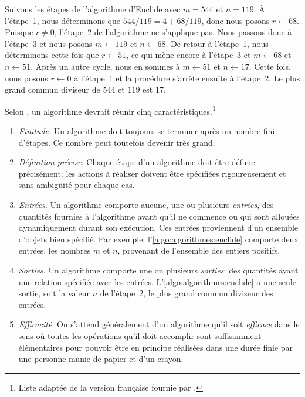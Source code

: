 Suivons les étapes de l'algorithme d'Euclide avec $m = 544$ et
$n = 119$. À l'étape~1, nous déterminons que $544/119 = 4 + 68/119$,
donc nous posons $r \leftarrow 68$. Puisque $r \neq 0$, l'étape~2 de
l'algorithme ne s'applique pas. Nous passons donc à l'étape~3 et nous
posons $m \leftarrow 119$ et $n \leftarrow 68$. De retour à l'étape~1,
nous déterminons cette fois que $r \leftarrow 51$, ce qui mène encore
à l'étape~3 et $m \leftarrow 68$ et $n \leftarrow 51$. Après un autre
cycle, nous en sommes à $m \leftarrow 51$ et $n \leftarrow 17$. Cette
fois, nous posons $r \leftarrow 0$ à l'étape~1 et la procédure
s'arrête ensuite à l'étape~2. Le plus grand commun diviseur de $544$
et $119$ est $17$.

Selon \citet[section~1.1]{Knuth:ACP:vol1:1997}, un algorithme devrait
réunir cinq caractéristiques.\footnote{%
  Liste adaptée de la version française fournie par
  \citet{Wikipedia:Algorithme}.}
\begin{enumerate}
\item \emph{Finitude}. Un algorithme doit toujours se terminer après
  un nombre fini d’étapes. Ce nombre peut toutefois devenir très
  grand.
\item \emph{Définition précise}. Chaque étape d'un algorithme doit
  être définie précisément; les actions à réaliser doivent être
  spécifiées rigoureusement et sans ambigüité pour chaque cas.
\item \emph{Entrées}. Un algorithme comporte aucune, une ou plusieurs
  \emph{entrées}, des quantités fournies à l'algorithme avant qu'il ne
  commence ou qui sont allouées dynamiquement durant son exécution.
  Ces entrées proviennent d'un ensemble d'objets bien spécifié. Par
  exemple, l'\autoref{algo:algorithmes:euclide} comporte deux entrées,
  les nombres $m$ et $n$, provenant de l'ensemble des entiers
  positifs.
\item \emph{Sorties}. Un algorithme comporte une ou plusieurs
  \emph{sorties}: des quantités ayant une relation spécifiée avec les
  entrées. L'\autoref{algo:algorithmes:euclide} a une seule sortie,
  soit la valeur $n$ de l'étape~2, le plus grand commun diviseur des
  entrées.
\item \emph{Efficacité}. On s'attend généralement d'un algorithme
  qu'il soit \emph{efficace} dans le sens où toutes les opérations
  qu'il doit accomplir sont suffisamment élémentaires pour pouvoir
  être en principe réalisées dans une durée finie par une personne
  munie de papier et d'un crayon.
\end{enumerate}

